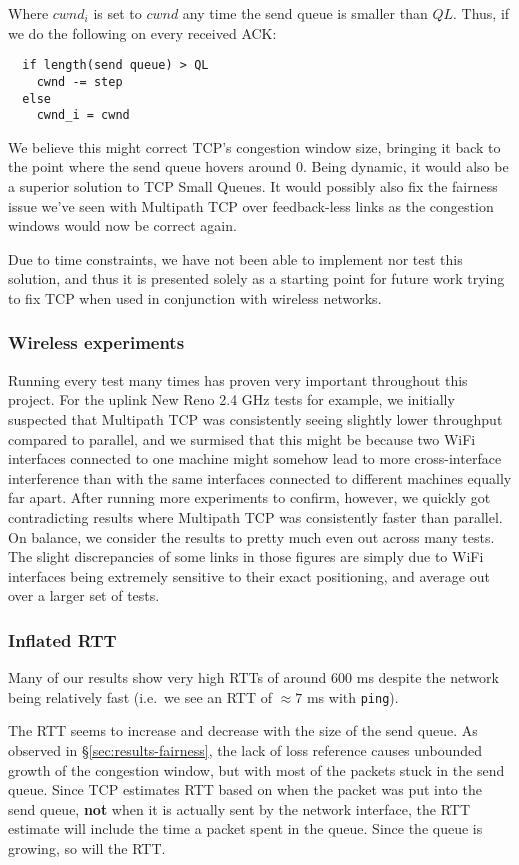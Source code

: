 Where $cwnd_i$ is set to $cwnd$ any time the send queue is smaller than $QL$.
Thus, if we do the following on every received ACK:

\begin{verbatim}
  if length(send queue) > QL
    cwnd -= step
  else
    cwnd_i = cwnd
\end{verbatim}

We believe this might correct TCP's congestion window size, bringing it back to
the point where the send queue hovers around 0. Being dynamic, it would also be
a superior solution to TCP Small Queues. It would possibly also fix the fairness
issue we've seen with Multipath TCP over feedback-less links as the congestion
windows would now be correct again.

Due to time constraints, we have not been able to implement nor test this
solution, and thus it is presented solely as a starting point for future work
trying to fix TCP when used in conjunction with wireless networks.

\subsubsection{Wireless experiments}
Running every test many times has proven very important throughout this project.
For the uplink New Reno 2.4 GHz tests for example, we initially suspected that
Multipath TCP was consistently seeing slightly lower throughput compared to
parallel, and we surmised that this might be because two WiFi interfaces
connected to one machine might somehow lead to more cross-interface interference
than with the same interfaces connected to different machines equally far apart.
After running more experiments to confirm, however, we quickly got contradicting
results where Multipath TCP was consistently faster than parallel. On balance,
we consider the results to pretty much even out across many tests. The slight
discrepancies of some links in those figures are simply due to WiFi interfaces
being extremely sensitive to their exact positioning, and average out over a
larger set of tests.

\subsubsection{Inflated RTT}
Many of our results show very high RTTs of around 600 ms despite the network
being relatively fast (i.e.\ we see an RTT of $\approx 7$ ms with
\texttt{ping}). 

The RTT seems to increase and decrease with the size of the send queue. As 
observed in \S\ref{sec:results-fairness}, the lack of loss reference causes 
unbounded growth of the congestion window, but with most of the packets stuck in 
the send queue. Since TCP estimates RTT based on when the packet was put into 
the send queue, \textbf{not} when it is actually sent by the network interface, 
the RTT estimate will include the time a packet spent in the queue. Since the 
queue is growing, so will the RTT.

